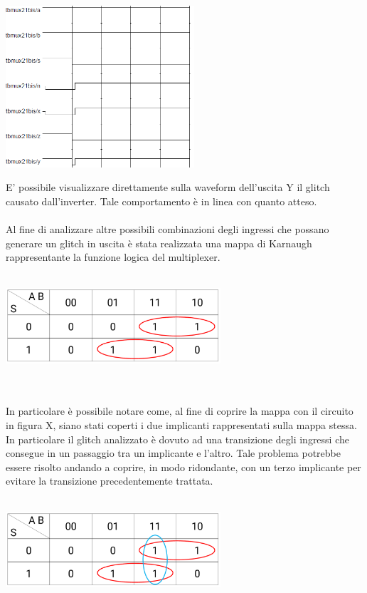 \documentclass[11pt,  english, makeidx, a4paper, titlepage, oneside]{book}
\begin{document}
\centerline{\includegraphics[width=7cm]{./img/Lab_1/Es_4/Glitch.png}}
\newpage
E' possibile visualizzare direttamente sulla waveform dell'uscita Y
il glitch causato dall'inverter. Tale comportamento è in linea con 
quanto atteso.
\\\\
Al fine di analizzare altre possibili combinazioni degli ingressi
che possano generare un glitch in uscita è stata realizzata una 
mappa di Karnaugh rappresentante la funzione logica del multiplexer.
\\\\
\centerline{\includegraphics[width=8cm]{./img/Lab_1/Es_4/Mappa_K_coperta.png}}
\\\\
In particolare è possibile notare come, al fine di coprire la mappa
con il circuito in figura X, siano stati coperti i due implicanti
rappresentati sulla mappa stessa. In particolare il glitch analizzato
è dovuto ad una transizione degli ingressi che consegue in un passaggio
tra un implicante e l'altro. Tale problema potrebbe essere risolto
andando a coprire, in modo ridondante, con un terzo implicante per evitare
la transizione precedentemente trattata. 
\\\\
\centerline{\includegraphics[width=8cm]{./img/Lab_1/Es_4/Mappa_K_supercoperta.png}}
\end{document}
